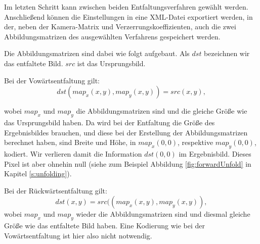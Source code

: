 Im letzten Schritt kann zwischen beiden Entfaltungsverfahren gewählt werden. Anschließend können die Einstellungen in eine XML-Datei exportiert werden, in der, neben der Kamera-Matrix und Verzerrungskoeffizienten, auch die zwei Abbildungsmatrizen des ausgewählten Verfahrens gespeichert werden. 


Die Abbildungsmatrizen sind dabei wie folgt aufgebaut. Als $dst$ bezeichnen wir das entfaltete Bild. $src$ ist das Ursprungsbild.

Bei der Vowärtsentfaltung gilt:
\[
dst(map_x(x,y), map_y(x,y)) = src(x,y),
\]

wobei $map_x$ und $map_y$ die Abbildungsmatrizen sind und die gleiche Größe wie das Ursprungsbild haben. Da wird bei der Entfaltung die Größe des Ergebnisbildes brauchen, und diese bei der Erstellung der Abbildungsmatrizen berechnet haben, sind Breite und Höhe, in $map_x(0,0)$, respektive $map_y(0,0)$, kodiert. Wir verlieren damit die Information $dst(0,0)$ im Ergebnisbild. Dieses Pixel ist aber ohnehin null (siehe zum Beispiel Abbildung \ref{fig:forwardUnfold} in Kapitel \ref{s:unfolding}). 

Bei der Rückwärtsentfaltung gilt:
\[
dst(x,y) = src((map_x(x,y),map_y(x,y)),
\]
wobei $map_x$ und $map_y$ wieder die Abbildungsmatrizen sind und diesmal gleiche Größe wie das entfaltete Bild haben. Eine Kodierung wie bei der Vowärtsentfaltung ist hier also nicht notwendig.
